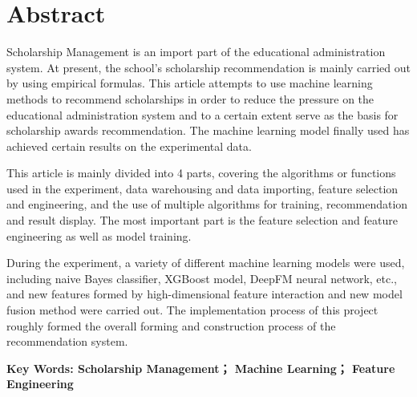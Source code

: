 \begin{spacing}{0.95}
  \centering
  \heiti{}\textbf{\thesisTitleEN}
\end{spacing}

\vspace*{17mm}

{\let\clearpage\relax \chapter*{
  \textmd{Abstract}\vskip -3bp}}
\setcounter{page}{2}

\setlength{\parskip}{0em}

Scholarship Management is an import part of the educational administration system. At present, the school's scholarship recommendation is mainly carried out by using empirical formulas.
This article attempts to use machine learning methods to recommend scholarships in order to reduce the pressure on the educational administration system and to a certain extent serve as the basis for scholarship awards recommendation. The machine learning model finally used has achieved certain results on the experimental data.

This article is mainly divided into 4 parts, covering the algorithms or functions used in the experiment, data warehousing and data importing, feature selection and engineering, and the use of multiple algorithms for training, recommendation and result display. The most important part is the feature selection and feature engineering as well as model training.

During the experiment, a variety of different machine learning models were used, including naive Bayes classifier, XGBoost model, DeepFM neural network, etc., and new features formed by high-dimensional feature interaction and new model fusion method were carried out. The implementation process of this project roughly formed the overall forming and construction process of the recommendation system.

\vspace{3ex}\noindent\textbf{Key Words: Scholarship Management； Machine Learning； Feature Engineering}
\newpage
